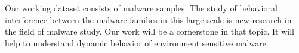 Our working dataset consists of {\gettotalmalwarei{}} malware samples.
The study of behavioral interference between the malware families in this large scale is new research in the field of malware study.
Our work will be a cornerstone in that topic.
It will help to understand dynamic behavior of environment sensitive malware.
